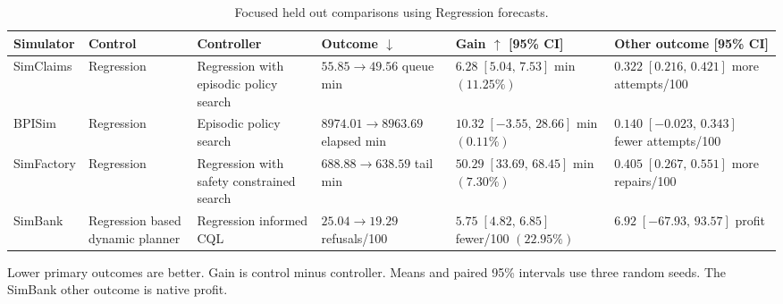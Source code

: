 \begin{table}[!t]
\caption{Focused held out comparisons using Regression forecasts.}
\label{tab:focused}
\centering\footnotesize
\setlength{\tabcolsep}{2.5pt}
\renewcommand{\arraystretch}{1.14}
\begin{tabularx}{\textwidth}{@{}L{.58in}L{.90in}L{1.20in}L{1.15in}L{1.42in}Y@{}}
\toprule
Simulator & Control & Controller & Outcome $\downarrow$ & Gain $\uparrow$ [95\% CI] & Other outcome [95\% CI] \\
\midrule
SimClaims & Regression & Regression with episodic policy search & $55.85\to49.56$ queue min & $6.28\;[5.04,\,7.53]$ min $(11.25\%)$ & $0.322\;[0.216,\,0.421]$ more attempts/100 \\
BPISim & Regression & Episodic policy search & $8974.01\to8963.69$ elapsed min & $10.32\;[-3.55,\,28.66]$ min $(0.11\%)$ & $0.140\;[-0.023,\,0.343]$ fewer attempts/100 \\
SimFactory & Regression & Regression with safety constrained search & $688.88\to638.59$ tail min & $50.29\;[33.69,\,68.45]$ min $(7.30\%)$ & $0.405\;[0.267,\,0.551]$ more repairs/100 \\
SimBank & Regression based dynamic planner & Regression informed CQL & $25.04\to19.29$ refusals/100 & $5.75\;[4.82,\,6.85]$ fewer/100 $(22.95\%)$ & $6.92\;[-67.93,\,93.57]$ profit \\
\bottomrule
\end{tabularx}
\par\smallskip
\begin{minipage}{\textwidth}\footnotesize
Lower primary outcomes are better. Gain is control minus controller. Means and paired 95\% intervals use three random seeds. The SimBank other outcome is native profit.
\end{minipage}
\end{table}
